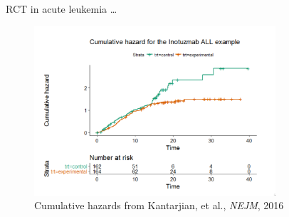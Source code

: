 \documentclass[ignorenonframetext,]{beamer}
\begin{document}
\begin{frame}{%
\protect\hypertarget{rct-in-acute-leukemia-1}{%
RCT in acute leukemia \ldots}}

\begin{figure}
\centering
\includegraphics[width=0.8\textwidth,height=\textheight]{../figures/cum_haz_ALL.pdf}
\caption{Cumulative hazards from Kantarjian, et al., \emph{NEJM}, 2016}
\end{figure}

\end{frame}
\end{document}
